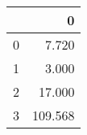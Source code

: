 \begin{tabular}{lr}
\toprule
{} &        0 \\
\midrule
0 &    7.720 \\
1 &    3.000 \\
2 &   17.000 \\
3 &  109.568 \\
\bottomrule
\end{tabular}
